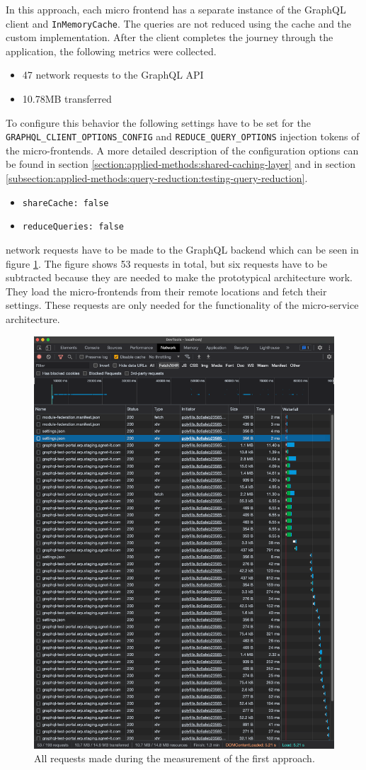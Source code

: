 In this approach, each micro frontend has a separate instance of the GraphQL client and \texttt{InMemoryCache}. The queries are not reduced using the cache and the custom implementation. After the client completes the journey through the application, the following metrics were collected.

\begin{itemize}
  \item 47 network requests to the GraphQL \ac{API}
  \item 10.78MB transferred
\end{itemize}

\noindent To configure this behavior the following settings have to be set for the \texttt{GRAPHQL\_CLIENT\_OPTIONS\_CONFIG} and \texttt{REDUCE\_QUERY\_OPTIONS} injection tokens of the micro-frontends. A more detailed description of the configuration options can be found in section \ref{section:applied-methods:shared-caching-layer} and in section \ref{subsection:applied-methods:query-reduction:testing-query-reduction}.

\begin{itemize}
  \item \texttt{shareCache: false}
  \item \texttt{reduceQueries: false}
\end{itemize}

 network requests have to be made to the GraphQL backend which can be seen in figure \ref{fig:results:no-shared-cache-no-reduction}. The figure shows 53 requests in total, but six requests have to be subtracted because they are needed to make the prototypical architecture work. They load the micro-frontends from their remote locations and fetch their settings. These requests are only needed for the functionality of the micro-service architecture.

\ifshowImages
\begin{figure}[H]
\centering
\includegraphics[width=0.6\linewidth]{images/results/1-attempt/no-shared-cache-no-reduction.png}
\caption{All requests made during the measurement of the first approach.}\label{fig:results:no-shared-cache-no-reduction}
\end{figure}
\fi

